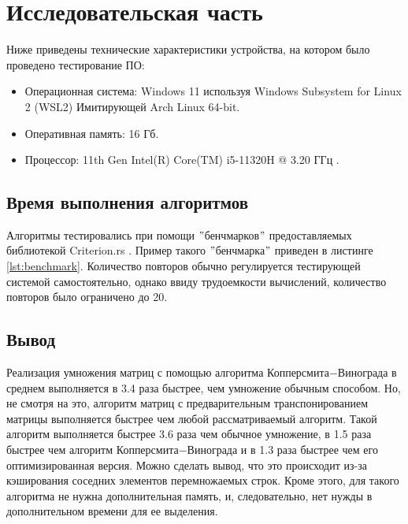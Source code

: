 \chapter{Исследовательская часть}
Ниже приведены технические характеристики устройства, на котором было проведено тестирование ПО:

\begin{itemize}
    \item Операционная система: Windows 11 используя Windows Subsystem for Linux 2 (WSL2) \cite{wsl2} Имитирующей Arch Linux \cite{arch} 64-bit.
    \item Оперативная память: 16 Гб.
    \item Процессор: 11th Gen Intel(R) Core(TM) i5-11320H @ 3.20 ГГц \cite{i5}.
\end{itemize}

\section{Время выполнения алгоритмов}
Алгоритмы тестировались при помощи \("\)бенчмарков\("\) предоставляемых библиотекой Criterion.rs \cite{Criterion}.
Пример такого \("\)бенчмарка\("\) приведен в листинге \ref{lst:benchmark}.
Количество повторов обычно регулируется тестирующей системой самостоятельно, однако ввиду трудоемкости вычислений, количество повторов было ограничено до 20.



\section{Вывод}

Реализация умножения матриц с помощью алгоритма Копперсмита$-$Винограда в среднем выполняется в 3.4 раза быстрее, чем умножение обычным способом. Но, не смотря на это, алгоритм матриц с предварительным транспонированием матрицы выполняется быстрее чем любой рассматриваемый алгоритм. Такой алгоритм выполняется быстрее 3.6 раза чем обычное умножение, в 1.5 раза быстрее чем алгоритм Копперсмита$-$Винограда и в 1.3 раза быстрее чем его оптимизированная версия. Можно сделать вывод, что это происходит из-за кэширования соседних элементов перемножаемых строк. Кроме этого, для такого алгоритма не нужна дополнительная память, и, следовательно, нет нужды в дополнительном времени для ее выделения.
